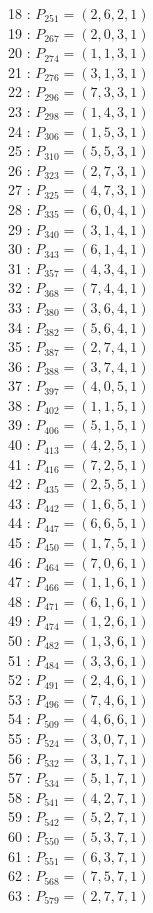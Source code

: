 \documentclass{article}
\begin{document}
{\begin{multicols}{2}
18 : $P_{251}=( 2, 6, 2, 1 )$\\
19 : $P_{267}=( 2, 0, 3, 1 )$\\
20 : $P_{274}=( 1, 1, 3, 1 )$\\
21 : $P_{276}=( 3, 1, 3, 1 )$\\
22 : $P_{296}=( 7, 3, 3, 1 )$\\
23 : $P_{298}=( 1, 4, 3, 1 )$\\
24 : $P_{306}=( 1, 5, 3, 1 )$\\
25 : $P_{310}=( 5, 5, 3, 1 )$\\
26 : $P_{323}=( 2, 7, 3, 1 )$\\
27 : $P_{325}=( 4, 7, 3, 1 )$\\
28 : $P_{335}=( 6, 0, 4, 1 )$\\
29 : $P_{340}=( 3, 1, 4, 1 )$\\
30 : $P_{343}=( 6, 1, 4, 1 )$\\
31 : $P_{357}=( 4, 3, 4, 1 )$\\
32 : $P_{368}=( 7, 4, 4, 1 )$\\
33 : $P_{380}=( 3, 6, 4, 1 )$\\
34 : $P_{382}=( 5, 6, 4, 1 )$\\
35 : $P_{387}=( 2, 7, 4, 1 )$\\
36 : $P_{388}=( 3, 7, 4, 1 )$\\
37 : $P_{397}=( 4, 0, 5, 1 )$\\
38 : $P_{402}=( 1, 1, 5, 1 )$\\
39 : $P_{406}=( 5, 1, 5, 1 )$\\
40 : $P_{413}=( 4, 2, 5, 1 )$\\
41 : $P_{416}=( 7, 2, 5, 1 )$\\
42 : $P_{435}=( 2, 5, 5, 1 )$\\
43 : $P_{442}=( 1, 6, 5, 1 )$\\
44 : $P_{447}=( 6, 6, 5, 1 )$\\
45 : $P_{450}=( 1, 7, 5, 1 )$\\
46 : $P_{464}=( 7, 0, 6, 1 )$\\
47 : $P_{466}=( 1, 1, 6, 1 )$\\
48 : $P_{471}=( 6, 1, 6, 1 )$\\
49 : $P_{474}=( 1, 2, 6, 1 )$\\
50 : $P_{482}=( 1, 3, 6, 1 )$\\
51 : $P_{484}=( 3, 3, 6, 1 )$\\
52 : $P_{491}=( 2, 4, 6, 1 )$\\
53 : $P_{496}=( 7, 4, 6, 1 )$\\
54 : $P_{509}=( 4, 6, 6, 1 )$\\
55 : $P_{524}=( 3, 0, 7, 1 )$\\
56 : $P_{532}=( 3, 1, 7, 1 )$\\
57 : $P_{534}=( 5, 1, 7, 1 )$\\
58 : $P_{541}=( 4, 2, 7, 1 )$\\
59 : $P_{542}=( 5, 2, 7, 1 )$\\
60 : $P_{550}=( 5, 3, 7, 1 )$\\
61 : $P_{551}=( 6, 3, 7, 1 )$\\
62 : $P_{568}=( 7, 5, 7, 1 )$\\
63 : $P_{579}=( 2, 7, 7, 1 )$\\
\end{multicols}
}
\end{document}
